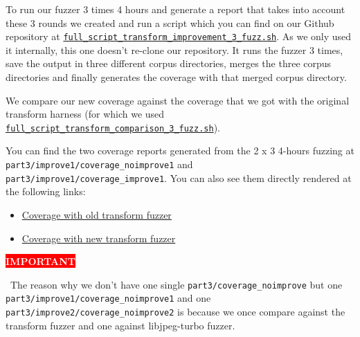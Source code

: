 \documentclass[12pt]{article}
\newcommand{\badgecolorbox}[2]{%
  \colorbox{#1}{\textcolor{white}{\bfseries #2}}%
}
\begin{document}
To run our fuzzer 3 times 4 hours and generate a report that takes into account these 3 rounds we created and run a script which you can find on our Github repository at \href{https://github.com/roxannecvl/oss-fuzz/blob/main/scripts/full_script_transform_improvement_3_fuzz.sh}{\texttt{full\_script\_transform\_improvement\_3\_fuzz.sh}}. As we only used it internally, this one doesn't re-clone our repository. It runs the fuzzer 3 times, save the output in three different corpus directories, merges the three corpus directories and finally generates the coverage with that merged corpus directory. 

We compare our new coverage against the coverage that we got with the original transform harness (for which we used \href{https://github.com/roxannecvl/oss-fuzz/blob/main/scripts/full_script_transform_comparison_3_fuzz.sh}{\texttt{full\_script\_transform\_comparison\_3\_fuzz.sh}}). 

You can find the two coverage reports generated from the 2 x 3 4-hours fuzzing at \texttt{part3/improve1/coverage\_noimprove1} and \texttt{part3/improve1/coverage\_improve1}. You can also see them directly rendered at the following links: 
\begin{itemize}
    \item \href{https://roxannecvl.github.io/oss-fuzz/coverage_reports/coverage_noimprove1/linux/report.html}{Coverage with old transform fuzzer}

    \item \href{https://roxannecvl.github.io/oss-fuzz/coverage_reports/coverage_improve1/linux/report.html}{Coverage with new transform fuzzer}
\end{itemize}


\badgecolorbox{red}{IMPORTANT}
\, The reason why we don't have one single \texttt{part3/coverage\_noimprove} but one \texttt{part3/improve1/coverage\_noimprove1} and one \texttt{part3/improve2/coverage\_noimprove2} is because we once compare against the transform fuzzer and one against libjpeg-turbo fuzzer. \\
\end{document}
